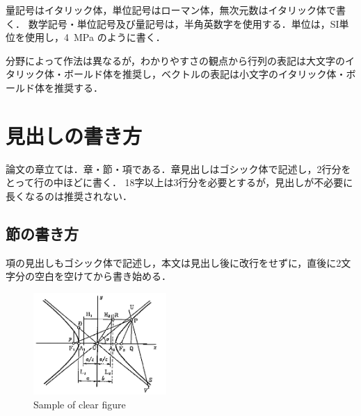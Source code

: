 \documentclass[10pt]{jarticle}
\begin{document}
    量記号はイタリック体，単位記号はローマン体，無次元数はイタリック体で書く．
    数学記号・単位記号及び量記号は，半角英数字を使用する．単位は，SI単位を使用し，4~MPa のように書く．
    
    分野によって作法は異なるが，わかりやすさの観点から行列の表記は大文字のイタリック体・ボールド体を推奨し，ベクトルの表記は小文字のイタリック体・ボールド体を推奨する．
    
    \section{見出しの書き方}%
    
    論文の章立ては．章・節・項である．章見出しはゴシック体で記述し，2行分をとって行の中ほどに書く．
    18字以上は3行分を必要とするが，見出しが不必要に長くなるのは推奨されない．
    
    \subsection{節の書き方}
    
    項の見出しもゴシック体で記述し，本文は見出し後に改行をせずに，直後に2文字分の空白を空けてから書き始める．
    
    \begin{center}
        \begin{figure}[!b]
            \includegraphics[width=0.45\textwidth]{./fig/sample.png}
            \caption{Sample of clear figure}
            \label{fig:sample-fig}
        \end{figure}
    \end{center}
    
\end{document}
